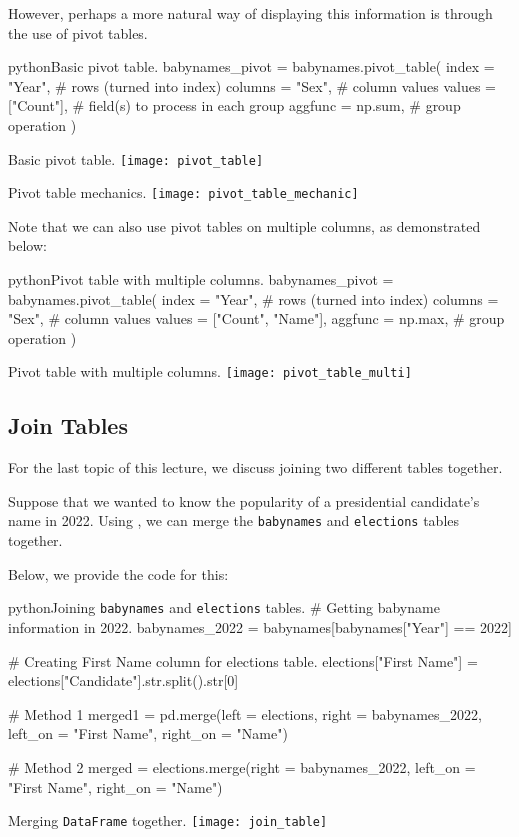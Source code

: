 \documentclass[openany]{book}
\begin{document}
However, perhaps a more natural way of displaying this information is through the use of pivot tables. 
\begin{code}{python}{Basic pivot table.}
babynames_pivot = babynames.pivot_table(
index = "Year",     # rows (turned into index)
columns = "Sex",    # column values
values = ["Count"], # field(s) to process in each group
aggfunc = np.sum,   # group operation
)
\end{code}
\begin{figurebox}[]{Basic pivot table.}
	\centering\texttt{[image: pivot\_table]}
\end{figurebox}

\begin{figurebox}[]{Pivot table mechanics.}
	\centering\texttt{[image: pivot\_table\_mechanic]}
\end{figurebox}

Note that we can also use pivot tables on multiple columns, as demonstrated below:
\begin{code}{python}{Pivot table with multiple columns.}
babynames_pivot = babynames.pivot_table(
index = "Year",     # rows (turned into index)
columns = "Sex",    # column values
values = ["Count", "Name"],
aggfunc = np.max,   # group operation
)
\end{code}
\begin{figurebox}[]{Pivot table with multiple columns.}
	\centering\texttt{[image: pivot\_table\_multi]}
\end{figurebox}

\subsection{Join Tables}
For the last topic of this lecture, we discuss joining two different tables together.

\begin{example}
	Suppose that we wanted to know the popularity of a presidential candidate's name in 2022. Using , we can merge the \texttt{babynames} and \texttt{elections} tables together.
\end{example}

Below, we provide the code for this:
\begin{code}{python}{Joining \texttt{babynames} and \texttt{elections} tables.}
# Getting babyname information in 2022.
babynames_2022 = babynames[babynames["Year"] == 2022]

# Creating First Name column for elections table.
elections["First Name"] = elections["Candidate"].str.split().str[0]

# Method 1
merged1 = pd.merge(left = elections, right = babynames_2022, 
left_on = "First Name", right_on = "Name")

# Method 2
merged = elections.merge(right = babynames_2022, 
left_on = "First Name", right_on = "Name")
\end{code}
\begin{figurebox}[]{Merging \texttt{DataFrame} together.}
	\centering\texttt{[image: join\_table]}
\end{figurebox}
\end{document}
